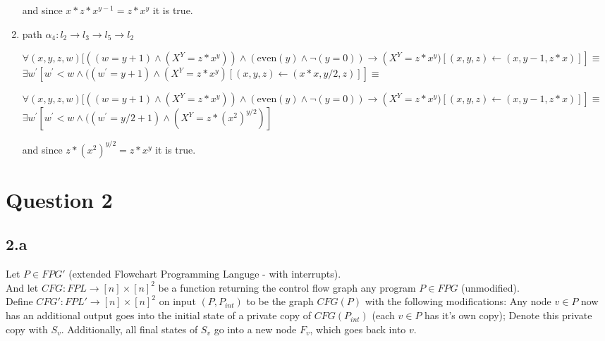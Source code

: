 \documentclass{article}
\begin{document}
\begin{enumerate}
and since $x*z*x^{y-1} = z*x^y$ it is true.

 
 \item  path $\alpha_4: l_2 \rightarrow l_3 \rightarrow l_5 \rightarrow l_2$ 

$\forall(x, y, z, w)[ ((w=y+1) \wedge (X^Y= z*x^y)) \wedge ( \text{even}(y) \wedge \neg (y=0)) \rightarrow\left(X^Y=z*x^y)[(x, y, z) \leftarrow(x,y-1,z*x)]\right] \equiv$ \\
$\exists w^{\prime}[w^{\prime}<w \wedge((w^{\prime}=y+1) \wedge (X^Y=z*x^y)[(x, y, z) \leftarrow(x*x, y/2, z)]]  \equiv$

$\forall(x, y, z, w)[ ((w=y+1) \wedge (X^Y= z*x^y)) \wedge (\text{even}(y) \wedge \neg (y=0)) \rightarrow\left(X^Y=z*x^y)[(x, y, z) \leftarrow(x,y-1,z*x)]\right] \equiv$ \\
$\exists w^{\prime}[w^{\prime}<w \wedge((w^{\prime}=y/2+1) \wedge (X^Y=z*(x^2)^{y/2})]$
 
and since $z*(x^2)^{y/2}=z*x^y$ it is true.

\end{enumerate}



\section*{Question 2}
\subsection*{2.a}
Let $P\in FPG'$ (extended Flowchart Programming Languge - with interrupts).\\
And let $CFG:FPL\longrightarrow [n]\times [n]^2$ be a function returning
the control flow graph any program $P\in FPG$ (unmodified).\\

Define $CFG':FPL'\longrightarrow [n]\times [n]^2$ on input $(P,P_{int})$ to be the graph
$CFG(P)$ with the following modifications:
Any node $v\in P$ now has an additional output
goes into the initial
state of a private copy of $CFG(P_{int})$
(each $v\in P$ has it's own copy); Denote this private
copy with $S_v$. Additionally, all final states of $S_v$ go 
into a new node $F_v$, which goes back into $v$.\\
\end{document}
